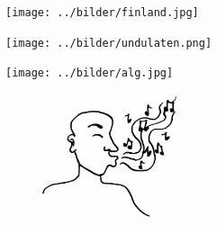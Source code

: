 \begin{intersong}
\begin{center}
\texttt{[image: ../bilder/finland.jpg]} 
\end{center}
\end{intersong}
\sclearpage

\sclearpage

\sclearpage

\begin{intersong}
\begin{center}
\texttt{[image: ../bilder/undulaten.png]} 
\end{center}
\end{intersong}
\sclearpage

\sclearpage

\sclearpage



\begin{intersong}
\begin{center}
\texttt{[image: ../bilder/alg.jpg]} 
\end{center}
\end{intersong}
\sclearpage


\sclearpage

\clearpage

\sclearpage

\clearpage


%
\clearpage
\begin{figure}[h]
	\begin{center}
		\includegraphics[width=40mm]{../bilder/fardigabilder/BilderTillKapitel/visslaren.png} 
	\end{center}
\end{figure}
